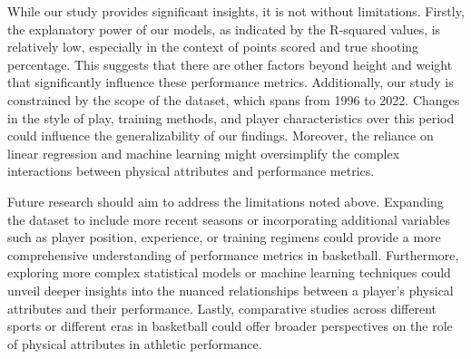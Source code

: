 \documentclass[12pt]{article}
\begin{document}
While our study provides significant insights, it is not without limitations. Firstly, the explanatory power of our models, as 
indicated by the R-squared values, is relatively low, especially in the context of points scored and true shooting percentage. This 
suggests that there are other factors beyond height and weight that significantly influence these performance metrics. Additionally, 
our study is constrained by the scope of the dataset, which spans from 1996 to 2022. Changes in the style of play, training 
methods, and player characteristics over this period could influence the generalizability of our findings. Moreover, the reliance 
on linear regression and machine learning might oversimplify the complex interactions between physical attributes and performance 
metrics.

Future research should aim to address the limitations noted above. Expanding the dataset to include more recent seasons or 
incorporating additional variables such as player position, experience, or training regimens could provide a more comprehensive 
understanding of performance metrics in basketball. Furthermore, exploring more complex statistical models or machine learning 
techniques could unveil deeper insights into the nuanced relationships between a player's physical attributes and their performance. 
Lastly, comparative studies across different sports or different eras in basketball could offer broader perspectives on the role of 
physical attributes in athletic performance.



\end{document}
